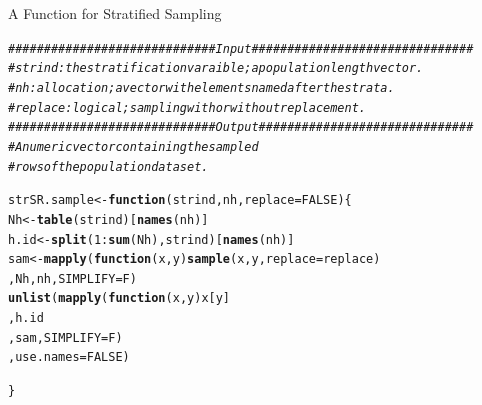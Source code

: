 \documentclass[11pt,german,hideothersubsections]{beamer}\usepackage[]{graphicx}\usepackage[]{color}
\makeatletter
\newcommand{\hlnum}[1]{\textcolor[rgb]{0.686,0.059,0.569}{#1}}%
\newcommand{\hlcom}[1]{\textcolor[rgb]{0.678,0.584,0.686}{\textit{#1}}}%
\newcommand{\hlopt}[1]{\textcolor[rgb]{0,0,0}{#1}}%
\newcommand{\hlstd}[1]{\textcolor[rgb]{0.345,0.345,0.345}{#1}}%
\newcommand{\hlkwa}[1]{\textcolor[rgb]{0.161,0.373,0.58}{\textbf{#1}}}%
\newcommand{\hlkwb}[1]{\textcolor[rgb]{0.69,0.353,0.396}{#1}}%
\newcommand{\hlkwc}[1]{\textcolor[rgb]{0.333,0.667,0.333}{#1}}%
\newcommand{\hlkwd}[1]{\textcolor[rgb]{0.737,0.353,0.396}{\textbf{#1}}}%
\newenvironment{kframe}{%
 \def\at@end@of@kframe{}%
 \ifinner\ifhmode%
  \def\at@end@of@kframe{\end{minipage}}%
  \begin{minipage}{\columnwidth}%
 \fi\fi%
 \def\FrameCommand##1{\hskip\@totalleftmargin \hskip-\fboxsep
 \colorbox{shadecolor}{##1}\hskip-\fboxsep
     \hskip-\linewidth \hskip-\@totalleftmargin \hskip\columnwidth}%
 \MakeFramed {\advance\hsize-\width
   \@totalleftmargin\z@ \linewidth\hsize
   \@setminipage}}%
 {\par\unskip\endMakeFramed%
 \at@end@of@kframe}
\newenvironment{knitrout}{}{} %
\makeatother
\begin{document}
\begin{frame}[fragile]{A Function for Stratified Sampling}
\begin{knitrout}\footnotesize
{}\color{fgcolor}\begin{kframe}
\begin{alltt}
\hlcom{############################# Input ###############################}
\hlcom{#strind: the stratification varaible; a population length vector.}
\hlcom{#nh:     allocation; a vector with elements named after the strata.}
\hlcom{#replace: logical; sampling with or without replacement.}
\hlcom{############################# Output ##############################}
\hlcom{#A numeric vector containing the sampled }
\hlcom{#rows of the population dataset.}

\hlstd{strSR.sample} \hlkwb{<-} \hlkwa{function}\hlstd{(}\hlkwc{strind}\hlstd{,} \hlkwc{nh}\hlstd{,} \hlkwc{replace}\hlstd{=}\hlnum{FALSE}\hlstd{)\{}
   \hlstd{Nh}   \hlkwb{<-} \hlkwd{table}\hlstd{(strind)[}\hlkwd{names}\hlstd{(nh)]}
   \hlstd{h.id} \hlkwb{<-} \hlkwd{split}\hlstd{(}\hlnum{1}\hlopt{:}\hlkwd{sum}\hlstd{(Nh), strind)[}\hlkwd{names}\hlstd{(nh)]}
   \hlstd{sam} \hlkwb{<-} \hlkwd{mapply}\hlstd{(} \hlkwa{function}\hlstd{(}\hlkwc{x}\hlstd{,}\hlkwc{y}\hlstd{)} \hlkwd{sample}\hlstd{(x, y,} \hlkwc{replace}\hlstd{=replace)}
                 \hlstd{, Nh, nh,} \hlkwc{SIMPLIFY} \hlstd{= F)}
   \hlkwd{unlist}\hlstd{(}\hlkwd{mapply}\hlstd{(}\hlkwa{function}\hlstd{(}\hlkwc{x}\hlstd{,}\hlkwc{y}\hlstd{) x[y]}
                 \hlstd{, h.id}
                 \hlstd{, sam,} \hlkwc{SIMPLIFY} \hlstd{= F)}
          \hlstd{,}\hlkwc{use.names} \hlstd{=} \hlnum{FALSE}\hlstd{)}

\hlstd{\}}
\end{alltt}
\end{kframe}
\end{knitrout}
\end{frame}
\end{document}
